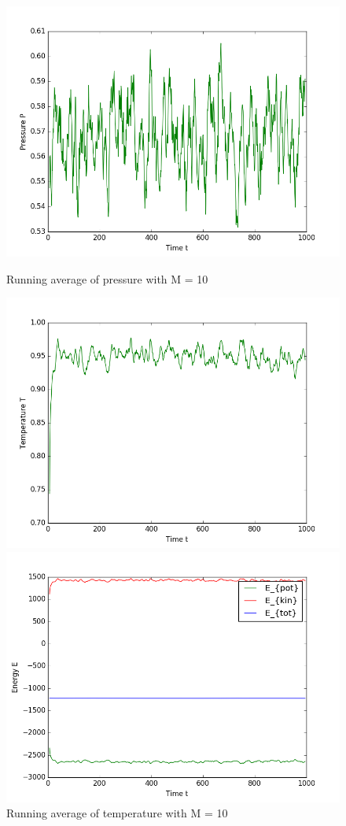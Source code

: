 \begin{figure}[h]
  \includegraphics[width=\linewidth]{fig/avPressure_M10.png}
  \caption{Running average of pressure with M = 10}\label{fig:pres1}
\endminipage\hfill
{}
  \includegraphics[width=\linewidth]{fig/avTemperature_M10.png}
  \caption{Running average of temperature with M = 10}\label{fig:temp1}
\endminipage\hfill
{}
  \includegraphics[width=\linewidth]{fig/avEnergies_M10.png}

\end{figure}
